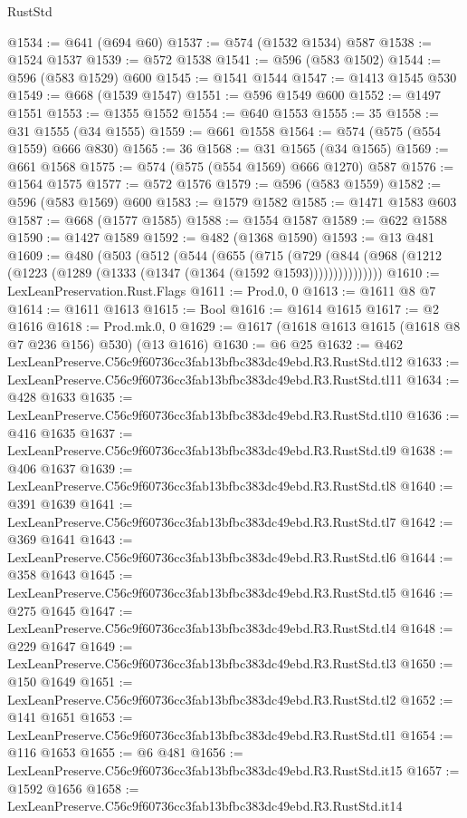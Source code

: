 \begin{lexlean}{RustStd}
\begin{coremodule}
@1534 := @641 (@694 @60)
@1537 := @574 (@1532 @1534) @587
@1538 := @1524 @1537
@1539 := @572 @1538
@1541 := @596 (@583 @1502)
@1544 := @596 (@583 @1529) @600
@1545 := @1541 @1544
@1547 := @1413 @1545 @530
@1549 := @668 (@1539 @1547)
@1551 := @596 @1549 @600
@1552 := @1497 @1551
@1553 := @1355 @1552
@1554 := @640 @1553
@1555 := 35
@1558 := @31 @1555 (@34 @1555)
@1559 := @661 @1558
@1564 := @574 (@575 (@554 @1559) @666 @830)
@1565 := 36
@1568 := @31 @1565 (@34 @1565)
@1569 := @661 @1568
@1575 := @574 (@575 (@554 @1569) @666 @1270) @587
@1576 := @1564 @1575
@1577 := @572 @1576
@1579 := @596 (@583 @1559)
@1582 := @596 (@583 @1569) @600
@1583 := @1579 @1582
@1585 := @1471 @1583 @603
@1587 := @668 (@1577 @1585)
@1588 := @1554 @1587
@1589 := @622 @1588
@1590 := @1427 @1589
@1592 := @482 (@1368 @1590)
@1593 := @13 @481
@1609 := @480
    (@503
      (@512
        (@544
          (@655
            (@715
              (@729
                (@844 (@968 (@1212 (@1223 (@1289 (@1333 (@1347 (@1364 (@1592 @1593)))))))))))))))
@1610 := LexLeanPreservation.Rust.Flags
@1611 := Prod.{0, 0}
@1613 := @1611 @8 @7
@1614 := @1611 @1613
@1615 := Bool
@1616 := @1614 @1615
@1617 := @2 @1616
@1618 := Prod.mk.{0, 0}
@1629 := @1617 (@1618 @1613 @1615 (@1618 @8 @7 @236 @156) @530) (@13 @1616)
@1630 := @6 @25
@1632 := @462 LexLeanPreserve.C56c9f60736cc3fab13bfbc383dc49ebd.R3.RustStd.tl12
@1633 := LexLeanPreserve.C56c9f60736cc3fab13bfbc383dc49ebd.R3.RustStd.tl11
@1634 := @428 @1633
@1635 := LexLeanPreserve.C56c9f60736cc3fab13bfbc383dc49ebd.R3.RustStd.tl10
@1636 := @416 @1635
@1637 := LexLeanPreserve.C56c9f60736cc3fab13bfbc383dc49ebd.R3.RustStd.tl9
@1638 := @406 @1637
@1639 := LexLeanPreserve.C56c9f60736cc3fab13bfbc383dc49ebd.R3.RustStd.tl8
@1640 := @391 @1639
@1641 := LexLeanPreserve.C56c9f60736cc3fab13bfbc383dc49ebd.R3.RustStd.tl7
@1642 := @369 @1641
@1643 := LexLeanPreserve.C56c9f60736cc3fab13bfbc383dc49ebd.R3.RustStd.tl6
@1644 := @358 @1643
@1645 := LexLeanPreserve.C56c9f60736cc3fab13bfbc383dc49ebd.R3.RustStd.tl5
@1646 := @275 @1645
@1647 := LexLeanPreserve.C56c9f60736cc3fab13bfbc383dc49ebd.R3.RustStd.tl4
@1648 := @229 @1647
@1649 := LexLeanPreserve.C56c9f60736cc3fab13bfbc383dc49ebd.R3.RustStd.tl3
@1650 := @150 @1649
@1651 := LexLeanPreserve.C56c9f60736cc3fab13bfbc383dc49ebd.R3.RustStd.tl2
@1652 := @141 @1651
@1653 := LexLeanPreserve.C56c9f60736cc3fab13bfbc383dc49ebd.R3.RustStd.tl1
@1654 := @116 @1653
@1655 := @6 @481
@1656 := LexLeanPreserve.C56c9f60736cc3fab13bfbc383dc49ebd.R3.RustStd.it15
@1657 := @1592 @1656
@1658 := LexLeanPreserve.C56c9f60736cc3fab13bfbc383dc49ebd.R3.RustStd.it14

\end{coremodule}
\end{lexlean}
